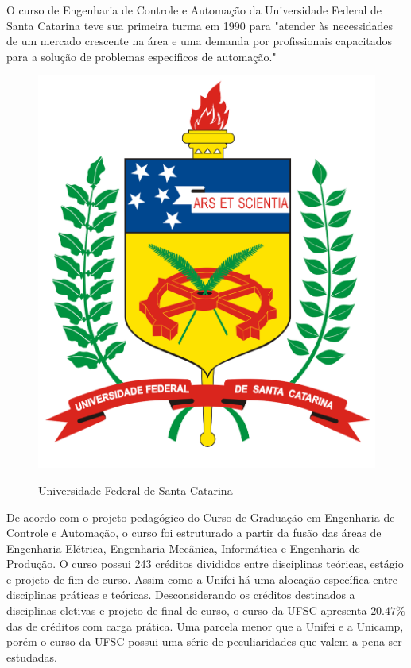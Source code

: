 \documentclass[12pt]{article} %
\begin{document}
O curso de Engenharia de Controle e Automação da Universidade Federal de Santa Catarina teve sua primeira turma em 1990 para "atender às necessidades de um mercado crescente na área e uma demanda por profissionais capacitados para a solução de problemas especificos de automação."

\begin{figure}[H]
\centering
\includegraphics[scale=0.15]{pictures/ufscLogo.png}\\
\caption{Universidade Federal de Santa Catarina}
\end{figure}

De acordo com o projeto pedagógico do Curso de Graduação em Engenharia de Controle e Automação, o curso foi estruturado a partir da fusão das áreas de Engenharia Elétrica, Engenharia Mecânica, Informática e Engenharia de Produção. O curso possui 243 créditos divididos entre disciplinas teóricas, estágio e projeto de fim de curso.  Assim como a Unifei há uma alocação específica entre disciplinas práticas e teóricas. Desconsiderando os créditos destinados a disciplinas eletivas e projeto de final de curso, o curso da UFSC apresenta $20.47\%$ das de créditos com carga prática. Uma parcela menor que a Unifei e a Unicamp, porém o curso da UFSC possui uma série de peculiaridades que valem a pena ser estudadas.
\end{document}
